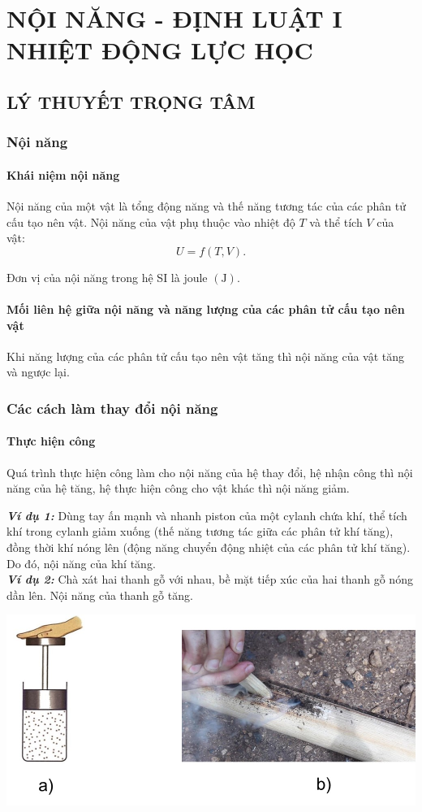 \section{NỘI NĂNG - ĐỊNH LUẬT I NHIỆT ĐỘNG LỰC HỌC}
\subsection{LÝ THUYẾT TRỌNG TÂM}
\begin{tomtat}
\subsubsection{Nội năng}
\paragraph{Khái niệm nội năng}
\begin{dn}
	Nội năng của một vật là tổng động năng và thế năng tương tác của các phân tử cấu tạo nên vật. Nội năng của vật phụ thuộc vào nhiệt độ $T$ và thể tích $V$ của vật:
	$$U=f\left(T, V\right).$$
\end{dn}
Đơn vị của nội năng trong hệ SI là joule $\left(\si{\joule}\right)$.
\paragraph{Mối liên hệ giữa nội năng và năng lượng của các phân tử cấu tạo nên vật}
\begin{boxdn}
	Khi năng lượng của các phân tử cấu tạo nên vật tăng thì nội năng của vật tăng và ngược lại.
\end{boxdn}
\subsubsection{Các cách làm thay đổi nội năng}
\paragraph{Thực hiện công}
\begin{boxdn}
	Quá trình thực hiện công làm cho nội năng của hệ thay đổi, hệ nhận công thì nội năng của hệ tăng, hệ thực hiện công cho vật khác thì nội năng giảm.
\end{boxdn}
	\textbf{\textit{Ví dụ 1:}} Dùng tay ấn mạnh và nhanh piston của một cylanh chứa khí, thể tích khí trong cylanh giảm xuống (thế năng tương tác giữa các phân tử khí tăng), đồng thời khí nóng lên (động năng chuyển động nhiệt của các phân tử khí tăng). Do đó, nội năng của khí tăng.\\
	\textbf{\textit{Ví dụ 2:}} Chà xát hai thanh gỗ với nhau, bề mặt tiếp xúc của hai thanh gỗ nóng dần lên. Nội năng của thanh gỗ tăng.
\begin{center}
	\includegraphics[width=0.45\linewidth	]{figs/VN12-Y24-PH-SYL-003-1}
\end{center}

\end{tomtat}
